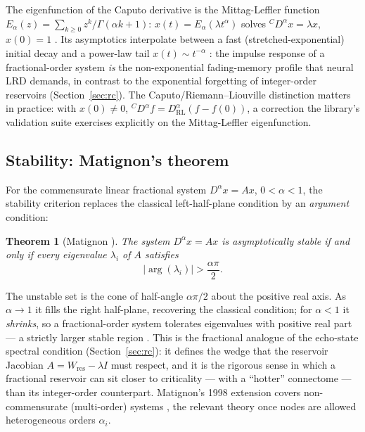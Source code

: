 \documentclass[11pt,a4paper]{article}
\newtheorem{theorem}{Theorem}[section]
\begin{document}
The eigenfunction of the Caputo derivative is the Mittag-Leffler function
$E_\alpha(z) = \sum_{k\ge0} z^k/\Gamma(\alpha k + 1)$: $x(t) = E_\alpha(\lambda
t^\alpha)$ solves ${}^C D^\alpha x = \lambda x$, $x(0)=1$
\cite{podlubny1999fractional,gorenflo2014mittag}. Its asymptotics interpolate
between a fast (stretched-exponential) initial decay and a power-law tail
$x(t) \sim t^{-\alpha}$ \cite{gorenflo2014mittag,haubold2011mittag}: the
impulse response of a fractional-order system \emph{is} the non-exponential
fading-memory profile that neural LRD demands, in contrast to the exponential
forgetting of integer-order reservoirs (Section~\ref{sec:rc}). The
Caputo/Riemann--Liouville distinction matters in practice: with $x(0) \neq
0$, ${}^C D^\alpha f = D^\alpha_{\mathrm{RL}}(f - f(0))$, a correction the
library's validation suite exercises explicitly on the Mittag-Leffler
eigenfunction.

\subsection{Stability: Matignon's theorem}

For the commensurate linear fractional system $D^\alpha x = A x$,
$0<\alpha<1$, the stability criterion replaces the classical left-half-plane
condition by an \emph{argument} condition:

\begin{theorem}[Matignon \cite{matignon1996stability}]
  The system $D^\alpha x = A x$ is asymptotically stable if and only if
  every eigenvalue $\lambda_i$ of $A$ satisfies
  \begin{equation}
    |\arg(\lambda_i)| > \frac{\alpha \pi}{2}.
    \label{eq:matignon}
  \end{equation}
\end{theorem}

The unstable set is the cone of half-angle $\alpha\pi/2$ about the positive
real axis. As $\alpha \to 1$ it fills the right half-plane, recovering the
classical condition; for $\alpha < 1$ it \emph{shrinks}, so a
fractional-order system tolerates eigenvalues with positive real part --- a
strictly larger stable region \cite{matignon1996stability,matignon1998stability}.
This is the fractional analogue of the echo-state spectral condition
(Section~\ref{sec:rc}): it defines the wedge that the reservoir Jacobian
$A = W_{\mathrm{res}} - \lambda I$ must respect, and it is the rigorous sense
in which a fractional reservoir can sit closer to criticality --- with a
``hotter'' connectome --- than its integer-order counterpart. Matignon's 1998
extension covers non-commensurate (multi-order) systems
\cite{matignon1998stability}, the relevant theory once nodes are allowed
heterogeneous orders $\alpha_i$.
\end{document}
